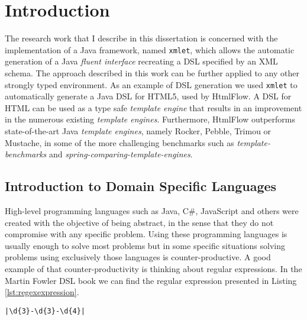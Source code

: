 \chapter{Introduction}
\label{cha:introduction}

\sloppy

The research work that I describe in this dissertation is concerned with the implementation of a Java framework, named \texttt{xmlet}, which allows the automatic generation of a Java \textit{fluent interface}\cite{dslbook} recreating a \ac{DSL}\cite{dslbook} specified by an \ac{XML} schema. The approach described in this work can be further applied to any other strongly typed environment. As an example of \ac{DSL} generation we used \texttt{xmlet} to automatically generate a Java \ac{DSL} for \ac{HTML}5, used by HtmlFlow\cite{htmlflow}. A \ac{DSL} for \ac{HTML} can be used as a type safe \textit{template engine} that results in an improvement in the numerous existing \textit{template engines}. Furthermore, HtmlFlow outperforms state-of-the-art Java \textit{template engines}, namely Rocker\cite{rocker}, Pebble\cite{pebble}, Trimou\cite{trimou} or Mustache\cite{mustache}, in some of the more challenging benchmarks such as \textit{template-benchmarks}\cite{templatebenchmark} and \textit{spring-comparing-template-engines}\cite{springbenchmark}.

\section{Introduction to Domain Specific Languages}


High-level programming languages such as Java, C\#, JavaScript and others were created with the objective of being abstract, in the sense that they do not compromise with any specific problem. Using these programming languages is usually enough to solve most problems but in some specific situations solving problems using exclusively those languages is counter-productive. A good example of that counter-productivity is thinking about regular expressions. In the Martin Fowler \ac{DSL} book\cite{dslbook} we can find the regular expression presented in Listing \ref{lst:regexexpression}.

\bigskip

\begin{minipage}{\linewidth}
\begin{lstlisting}[caption={Regular Expression Example}, label={lst:regexexpression}, style=dynamicviewsex]
|\d{3}-\d{3}-\d{4}|
\end{lstlisting}
\end{minipage} 

